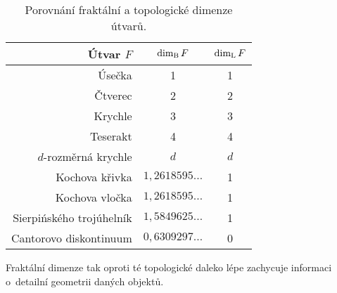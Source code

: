\begin{table}[h]
    \centering
    \begin{tabular}{r|cc}
    Útvar $F$                & $\operatorname{dim_B}{F}$            & $\operatorname{dim_L}{F}$ \\\hline
    Úsečka                   & 1                     & 1          \\
    Čtverec                  & 2                     & 2          \\
    Krychle                  & 3                     & 3          \\
    Teserakt                 & 4                     & 4          \\
    $d$-rozměrná krychle     & $d$                   & $d$        \\
    Kochova křivka           & $1{,}2618595\dots$    & 1          \\
    Kochova vločka           & $1{,}2618595\dots$    & 1          \\
    Sierpińského trojúhelník & $1{,}5849625\dots$    & 1          \\
    Cantorovo diskontinuum   & $0{,}6309297\dots$    & 0      
    \end{tabular}
    \caption{Porovnání fraktální a topologické dimenze útvarů.}
    \label{table:fraktalni-topologicka-dimenze}
\end{table}
Fraktální dimenze tak oproti té topologické daleko lépe zachycuje informaci o~detailní geometrii daných objektů.